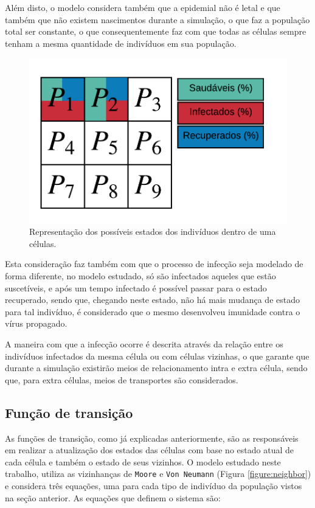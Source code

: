 \documentclass[a4paper,12pt]{article}
\begin{document}
Além disto, o modelo considera também que a epidemial não é letal e que também que não existem nascimentos durante a simulação, o que faz a população total ser constante, o que consequentemente faz com que todas as células sempre tenham a mesma quantidade de indivíduos em sua população.

\begin{figure}[ht]
 \begin{center}
  \includegraphics[width=0.7\linewidth]{fig/modelo_ca_artigo_v2.png}
 \end{center}
 \caption{Representação dos possíveis estados dos indivíduos dentro de uma células.}
\label{figure:cellArticle}
\end{figure}

Esta consideração faz também com que o processo de infecção seja modelado de forma diferente, no modelo estudado, só são infectados aqueles que estão suscetíveis, e após um tempo infectado é possível passar para o estado recuperado, sendo que, chegando neste estado, não há mais mudança de estado para tal indivíduo, é considerado que o mesmo desenvolveu imunidade contra o vírus propagado.

A maneira com que a infecção ocorre é descrita através da relação entre os indivíduos infectados da mesma célula ou com células vizinhas, o que garante que durante a simulação existirão meios de relacionamento intra e extra célula, sendo que, para extra células, meios de transportes são considerados. \\

\subsection{Função de transição}
As funções de transição, como já explicadas anteriormente, são as responsáveis em realizar a atualização dos estados das células com base no estado atual de cada célula e também o estado de seus vizinhos. O modelo estudado neste trabalho, utiliza as vizinhanças de \texttt{Moore} e \texttt{Von Neumann} (Figura \ref{figure:neighbor}) e considera três equações, uma para cada tipo de indivíduo da população vistos na seção anterior. As equações que definem o sistema são:
\end{document}
